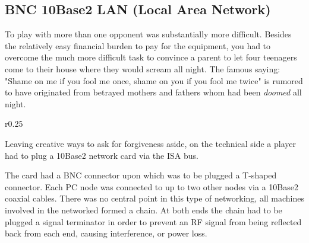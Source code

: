 \subsection{BNC 10Base2 LAN (Local Area Network)}
To play with more than one opponent was substantially more difficult. Besides the relatively easy financial burden to pay for the equipment, you had to overcome the much more difficult task to convince a parent to let four teenagers come to their house where they would scream all night. The famous saying: "Shame on me if you fool me once, shame on you if you fool me twice" is rumored to have originated from betrayed mothers and fathers whom had been \textit{doomed} all night.\\
\par



\begin{wrapfigure}[7]{r}{0.25\textwidth}
\centering
{}
\end{wrapfigure}

Leaving creative ways to ask for forgiveness aside, on the technical side a player had to plug a 10Base2 network card via the ISA bus. \\
\par The card had a BNC connector upon which was to be plugged a T-shaped connector. Each PC node was connected to up to two other nodes via a 10Base2 coaxial cables. There was no central point in this type of networking, all machines involved in the networked formed a chain. At both ends the chain had to be plugged a signal terminator in order to prevent an RF signal from being reflected back from each end, causing interference, or power loss.


